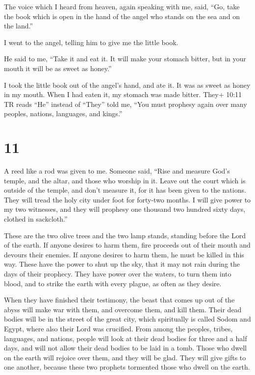  The voice which I heard from heaven, again speaking with
me, said, ``Go, take the book which is open in the hand of the angel who
stands on the sea and on the land.''

 I went to the angel, telling him to give me the little
book.

He said to me, ``Take it and eat it. It will make your stomach bitter,
but in your mouth it will be as sweet as honey.''

 I took the little book out of the angel's hand, and ate
it. It was as sweet as honey in my mouth. When I had eaten it, my
stomach was made bitter.  They+ 10:11 TR reads ``He''
instead of ``They'' told me, ``You must prophesy again over many
peoples, nations, languages, and kings.''

\hypertarget{section-10}{%
\section{11}\label{section-10}}

 A reed like a rod was given to me. Someone said, ``Rise and
measure God's temple, and the altar, and those who worship in it.
 Leave out the court which is outside of the temple, and
don't measure it, for it has been given to the nations. They will tread
the holy city under foot for forty-two months.  I will give
power to my two witnesses, and they will prophesy one thousand two
hundred sixty days, clothed in sackcloth.''

 These are the two olive trees and the two lamp stands,
standing before the Lord of the earth.  If anyone desires to
harm them, fire proceeds out of their mouth and devours their enemies.
If anyone desires to harm them, he must be killed in this way.
 These have the power to shut up the sky, that it may not
rain during the days of their prophecy. They have power over the waters,
to turn them into blood, and to strike the earth with every plague, as
often as they desire.

 When they have finished their testimony, the beast that
comes up out of the abyss will make war with them, and overcome them,
and kill them.  Their dead bodies will be in the street of
the great city, which spiritually is called Sodom and Egypt, where also
their Lord was crucified.  From among the peoples, tribes,
languages, and nations, people will look at their dead bodies for three
and a half days, and will not allow their dead bodies to be laid in a
tomb.  Those who dwell on the earth will rejoice over them,
and they will be glad. They will give gifts to one another, because
these two prophets tormented those who dwell on the earth.

